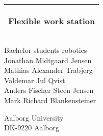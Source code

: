 %
%
%
%
%
\begin{titlepage}
  \addtolength{\hoffset}{0.5\evensidemargin-0.5\oddsidemargin} %
  \noindent%
  \begin{tabular}{@{}p{\textwidth}@{}}
    \toprule[2pt]
    \midrule
    \vspace{0.2cm}
    \begin{center}
    \Huge{\textbf{
      Flexible work station
    }}
    \end{center}
    \vspace{0.2cm}\\
    \midrule
    \toprule[2pt]
  \end{tabular}
  \vspace{4 cm}
  \begin{center}
    {\large
      Bachelor students robotics%
    }\\
    \vspace{0.2cm}
    {\Large
      Jonathan Midtgaard Jensen\\
      Mathias Alexander Trabjerg\\
      Valdemar Jul Qvist\\ 
      Anders Fischer Steen Jensen\\
      Mark Richard Blankensteiner\\
    }
  \end{center}
  \vfill
  \begin{center}
  Aalborg University\\
  DK-9220 Aalborg
  \end{center}
\end{titlepage}
\clearpage
